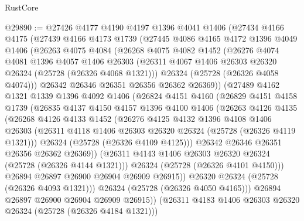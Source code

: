 \begin{lexlean}{RustCore}
\begin{coremodule}
@29890 := @27426
    @4177
    @4190
    @4197
    @1396
    @4041
    @1406
    (@27434
      @4166
      @4175
      (@27439
        @4166
        @4173
        @1739
        (@27445
          @4086
          @4165
          @4172
          @1396
          @4049
          @1406
          (@26263
            @4075
            @4084
            (@26268
              @4075
              @4082
              @1452
              (@26276
                @4074
                @4081
                @1396
                @4057
                @1406
                @26303
                (@26311 @4067 @1406 @26303 @26320 @26324 (@25728 (@26326 @4068 @1321)))
                @26324
                (@25728 (@26326 @4058 @4074)))
              @26342
              @26346
              @26351
              @26356
              @26362
              @26369))
          (@27489
            @4162
            @1321
            @1339
            @1396
            @4092
            @1406
            (@26824
              @4151
              @4160
              (@26829
                @4151
                @4158
                @1739
                (@26835
                  @4137
                  @4150
                  @4157
                  @1396
                  @4100
                  @1406
                  (@26263
                    @4126
                    @4135
                    (@26268
                      @4126
                      @4133
                      @1452
                      (@26276
                        @4125
                        @4132
                        @1396
                        @4108
                        @1406
                        @26303
                        (@26311 @4118 @1406 @26303 @26320 @26324 (@25728 (@26326 @4119 @1321)))
                        @26324
                        (@25728 (@26326 @4109 @4125)))
                      @26342
                      @26346
                      @26351
                      @26356
                      @26362
                      @26369))
                  (@26311 @4143 @1406 @26303 @26320 @26324 (@25728 (@26326 @4144 @1321)))
                  @26324
                  (@25728 (@26326 @4101 @4150)))
                @26894
                @26897
                @26900
                @26904
                @26909
                @26915))
            @26320
            @26324
            (@25728 (@26326 @4093 @1321)))
          @26324
          (@25728 (@26326 @4050 @4165)))
        @26894
        @26897
        @26900
        @26904
        @26909
        @26915))
    (@26311 @4183 @1406 @26303 @26320 @26324 (@25728 (@26326 @4184 @1321)))

\end{coremodule}
\end{lexlean}
